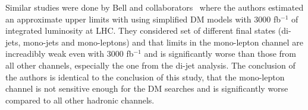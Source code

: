% 

Similar studies were done by Bell and collaborators~\cite{arXiv:1512.00476} where the authors estimated an approximate upper limits with using simplified DM models with 3000 fb$^{-1}$ of integrated luminosity at LHC. 
They considered set of different final states (di-jets, mono-jets and mono-leptons)
and that limits in the mono-lepton channel are increadibly weak even with 3000 fb$^{-1}$ and is significantly worse than those from all other channels, especially the one from the di-jet analysis. 
The conclusion of the authors is identical to the conclusion of this study, that the mono-lepton channel is not sensitive enough for the DM searches and is significantly worse compared to all other hadronic channels.




%
